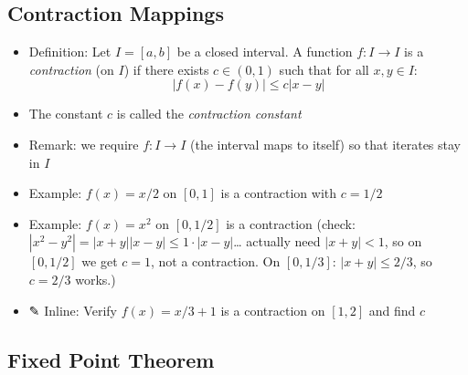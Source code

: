 \documentclass[
  10pt,
  letterpaper,
]{scrbook}
\providecommand{\tightlist}{%
  \setlength{\itemsep}{0pt}\setlength{\parskip}{0pt}}
\begin{document}
\subsection{Contraction Mappings}\label{contraction-mappings-1}

\begin{itemize}
\tightlist
\item
  Definition: Let \(I = [a, b]\) be a closed interval. A function
  \(f: I \to I\) is a \emph{contraction} (on \(I\)) if there exists
  \(c \in (0, 1)\) such that for all \(x, y \in I\):
  \[|f(x) - f(y)| \leq c|x - y|\]
\item
  The constant \(c\) is called the \emph{contraction constant}
\item
  Remark: we require \(f: I \to I\) (the interval maps to itself) so
  that iterates stay in \(I\)
\item
  Example: \(f(x) = x/2\) on \([0, 1]\) is a contraction with
  \(c = 1/2\)
\item
  Example: \(f(x) = x^2\) on \([0, 1/2]\) is a contraction (check:
  \(|x^2 - y^2| = |x+y||x-y| \leq 1 \cdot |x-y|\)\ldots{} actually need
  \(|x+y| < 1\), so on \([0, 1/2]\) we get \(c = 1\), not a contraction.
  On \([0, 1/3]\): \(|x+y| \leq 2/3\), so \(c = 2/3\) works.)
\item
  ✎ Inline: Verify \(f(x) = x/3 + 1\) is a contraction on \([1, 2]\) and
  find \(c\)
\end{itemize}

\subsection{Fixed Point Theorem}\label{fixed-point-theorem}
\end{document}
